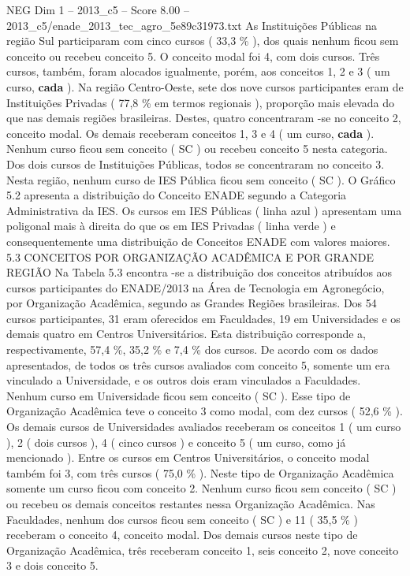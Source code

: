 \begin{textsample}{NEG Dim 1 – 2013\_c5 – Score 8.00 – 2013\_c5/enade\_2013\_tec\_agro\_5e89c31973.txt}
As Instituições Públicas na região Sul participaram com cinco cursos ( 33,3 \% ), dos quais nenhum ficou sem conceito ou recebeu conceito 5.
O conceito modal foi 4, com dois cursos.
Três cursos, também, foram alocados igualmente, porém, aos conceitos 1, 2 e 3 ( um curso, \textbf{cada} ).
Na região Centro-Oeste, sete dos nove cursos participantes eram de Instituições Privadas ( 77,8 \% em termos regionais ), proporção mais elevada do que nas demais regiões brasileiras.
Destes, quatro concentraram -se no conceito 2, conceito modal.
Os demais receberam conceitos 1, 3 e 4 ( um curso, \textbf{cada} ).
Nenhum curso ficou sem conceito ( SC ) ou recebeu conceito 5 nesta categoria.
Dos dois cursos de Instituições Públicas, todos se concentraram no conceito 3.
Nesta região, nenhum curso de IES Pública ficou sem conceito ( SC ).
O Gráfico 5.2 apresenta a distribuição do Conceito ENADE segundo a Categoria Administrativa da IES.
Os cursos em IES Públicas ( linha azul ) apresentam uma poligonal mais à direita do que os em IES Privadas ( linha verde ) e consequentemente uma distribuição de Conceitos ENADE com valores maiores. 5.3 CONCEITOS POR ORGANIZAÇÃO ACADÊMICA E POR GRANDE REGIÃO Na Tabela 5.3 encontra -se a distribuição dos conceitos atribuídos aos cursos participantes do ENADE/2013 na Área de Tecnologia em Agronegócio, por Organização Acadêmica, segundo as Grandes Regiões brasileiras.
Dos 54 cursos participantes, 31 eram oferecidos em Faculdades, 19 em Universidades e os demais quatro em Centros Universitários.
Esta distribuição corresponde a, respectivamente, 57,4 \%, 35,2 \% e 7,4 \% dos cursos.
De acordo com os dados apresentados, de todos os três cursos avaliados com conceito 5, somente um era vinculado a Universidade, e os outros dois eram vinculados a Faculdades.
Nenhum curso em Universidade ficou sem conceito ( SC ).
Esse tipo de Organização Acadêmica teve o conceito 3 como modal, com dez cursos ( 52,6 \% ).
Os demais cursos de Universidades avaliados receberam os conceitos 1 ( um curso ), 2 ( dois cursos ), 4 ( cinco cursos ) e conceito 5 ( um curso, como já mencionado ).
Entre os cursos em Centros Universitários, o conceito modal também foi 3, com três cursos ( 75,0 \% ).
Neste tipo de Organização Acadêmica somente um curso ficou com conceito 2.
Nenhum curso ficou sem conceito ( SC ) ou recebeu os demais conceitos restantes nessa Organização Acadêmica.
Nas Faculdades, nenhum dos cursos ficou sem conceito ( SC ) e 11 ( 35,5 \% ) receberam o conceito 4, conceito modal.
Dos demais cursos neste tipo de Organização Acadêmica, três receberam conceito 1, seis conceito 2, nove conceito 3 e dois conceito 5.

\end{textsample}
